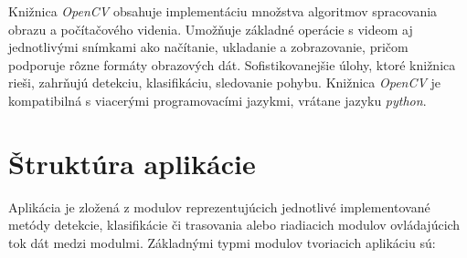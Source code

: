         Knižnica \emph{OpenCV} obsahuje implementáciu množstva algoritmov spracovania obrazu a počítačového videnia. Umožňuje základné operácie s videom aj jednotlivými snímkami ako načítanie, ukladanie a zobrazovanie, pričom podporuje rôzne formáty obrazových dát. Sofistikovanejšie úlohy, ktoré knižnica rieši, zahrňujú detekciu, klasifikáciu, sledovanie pohybu. Knižnica \emph{OpenCV} je kompatibilná s viacerými programovacími jazykmi, vrátane jazyku \emph{python}.

    \section{Štruktúra aplikácie}

        Aplikácia je zložená z modulov reprezentujúcich jednotlivé implementované metódy detekcie, klasifikácie či trasovania alebo riadiacich modulov ovládajúcich tok dát medzi modulmi. Základnými typmi modulov tvoriacich aplikáciu sú:

